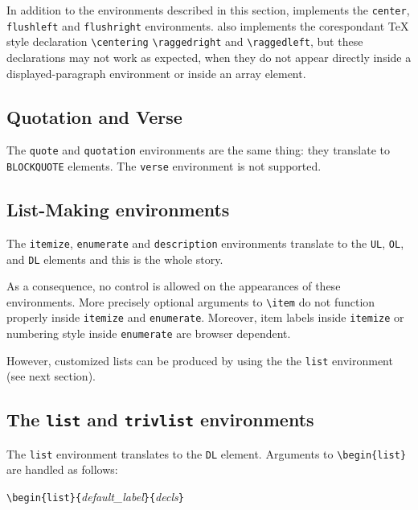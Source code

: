In addition to the environments described in this section,
\hevea{} implements the \verb+center+, \verb+flushleft+ and
\verb+flushright+ environments.
\hevea{} also implements the corespondant \TeX{} style declaration
\verb+\centering+ \verb+\raggedright+ and \verb+\raggedleft+,
but these declarations may not work as expected, when they do not
appear directly inside a displayed-paragraph environment or inside an array
element.



\subsection{Quotation and Verse}
The \verb+quote+ and \verb+quotation+ environments are the same thing: they
translate to \verb+BLOCKQUOTE+ elements.
The \verb+verse+ environment is not supported.

\subsection{List-Making environments}
The \verb+itemize+, \verb+enumerate+ and \verb+description+
environments translate to the \verb+UL+, \verb+OL+, and
\verb+DL+ elements and this is the whole story.

As a consequence, no control is allowed on the appearances of these
environments.  More precisely optional arguments to \verb+\item+ do not
function properly inside \verb+itemize+ and \verb+enumerate+.  Moreover, item
labels inside \verb+itemize+ or numbering style inside \verb+enumerate+
are browser dependent.

However, customized lists can be produced by using the
the \texttt{list} environment (see next section).


\subsection{The \protect\texttt{list} and \protect\texttt{trivlist}
environments}
The \verb+list+ environment translates to the
\verb+DL+ element.
Arguments to \verb+\begin{list}+ are handled as follows:

\begin{flushleft}
\quad\verb+\begin{list}{+{\it default\_label}\verb+}{+{\it decls}\verb+}+
\end{flushleft}

